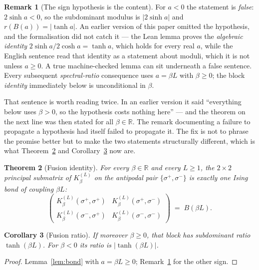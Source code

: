 \documentclass[11pt,a4paper]{article}
\theoremstyle{plain}
\newtheorem{theorem}{Theorem}[section]
\newtheorem{corollary}[theorem]{Corollary}
\theoremstyle{definition}
\newtheorem{remark}[theorem]{Remark}
\newcommand{\R}{\mathbb{R}}
\begin{document}
\begin{remark}[The sign hypothesis is the content]\label{rem:sign}
For $a<0$ the statement is \emph{false}: $2\sinh a<0$, so the subdominant
modulus is $|2\sinh a|$ and $r(B(a))=|\tanh a|$. An earlier version of this
paper omitted the hypothesis, and the formalisation did not catch it --- the
Lean lemma proves the \emph{algebraic identity} $2\sinh a/2\cosh a=\tanh a$,
which holds for every real $a$, while the English sentence read that identity as
a statement about moduli, which it is not unless $a\ge0$. A true machine-checked
lemma can sit underneath a false sentence. Every subsequent
\emph{spectral-ratio} consequence uses $a=\beta L$ with $\beta\ge0$; the block
\emph{identity} immediately below is unconditional in $\beta$.

That sentence is worth reading twice. In an earlier version it said ``everything
below uses $\beta>0$, so the hypothesis costs nothing here'' --- and the theorem
on the next line was then stated for all $\beta\in\R$. The remark documenting a
failure to propagate a hypothesis had itself failed to propagate it. The fix is
not to phrase the promise better but to make the two statements structurally
different, which is what Theorem~\ref{thm:fusion} and
Corollary~\ref{cor:fusionratio} now are.
\end{remark}

\begin{theorem}[Fusion identity]\label{thm:fusion}
For \emph{every} $\beta\in\R$ and every $L\ge1$, the $2\times 2$ principal
submatrix of $K_\beta^{(L)}$ on the antipodal pair $\{\sigma^+,\sigma^-\}$ is
exactly one Ising bond of coupling $\beta L$:
\[
  \begin{pmatrix}
    K_\beta^{(L)}(\sigma^+,\sigma^+) & K_\beta^{(L)}(\sigma^+,\sigma^-)\\[2pt]
    K_\beta^{(L)}(\sigma^-,\sigma^+) & K_\beta^{(L)}(\sigma^-,\sigma^-)
  \end{pmatrix}
  \;=\; B(\beta L).
\]
\end{theorem}

\begin{corollary}[Fusion ratio]\label{cor:fusionratio}
If moreover $\beta\ge0$, that block has subdominant ratio $\tanh(\beta L)$. For
$\beta<0$ its ratio is $|\tanh(\beta L)|$.
\end{corollary}

\begin{proof}
Lemma~\ref{lem:bond} with $a=\beta L\ge0$; Remark~\ref{rem:sign} for the other
sign.
\end{proof}
\end{document}

